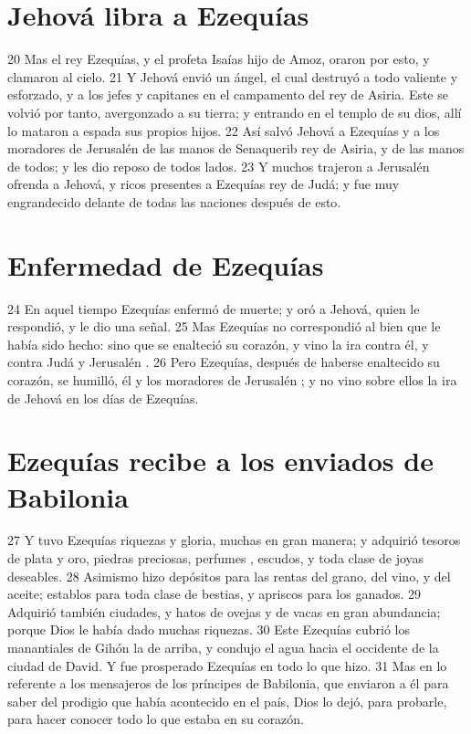 \section*{Jehová libra a Ezequías }

20 Mas el rey Ezequías, y el profeta Isaías hijo de Amoz, oraron por esto, y clamaron al cielo.
21 Y Jehová envió un ángel, el cual destruyó a todo valiente y esforzado, y a los jefes y capitanes en el campamento del rey de Asiria. Este se volvió por tanto, avergonzado a su tierra; y entrando en el templo de su dios, allí lo mataron a espada sus propios hijos.
22 Así salvó Jehová a Ezequías y a los moradores de Jerusalén  de las manos de Senaquerib rey de Asiria, y de las manos de todos; y les dio reposo de todos lados.
23 Y muchos trajeron a Jerusalén ofrenda a Jehová, y ricos presentes a Ezequías rey de Judá; y fue muy engrandecido delante de todas las naciones después de esto.

\section*{Enfermedad de Ezequías }

24 En aquel tiempo Ezequías enfermó de muerte; y oró a Jehová, quien le respondió, y le dio una señal.
25 Mas Ezequías no correspondió al bien que le había sido hecho: sino que se enalteció su corazón, y vino la ira contra él, y contra Judá y Jerusalén .
26 Pero Ezequías, después de haberse enaltecido su corazón, se humilló, él y los moradores de Jerusalén ; y no vino sobre ellos la ira de Jehová en los días de Ezequías.

\section*{Ezequías recibe a los enviados de Babilonia }

27 Y tuvo Ezequías riquezas y gloria, muchas en gran manera; y adquirió tesoros de plata y oro, piedras preciosas, perfumes , escudos, y toda clase de joyas deseables.
28 Asimismo hizo depósitos para las rentas del grano, del vino, y del aceite; establos para toda clase de bestias, y apriscos para los ganados. 
29 Adquirió también ciudades, y hatos de ovejas y de vacas en gran abundancia; porque Dios le había dado muchas riquezas.
30 Este Ezequías cubrió los manantiales de Gihón la de arriba, y condujo el agua hacia el occidente de la ciudad de David. Y fue prosperado Ezequías en todo lo que hizo.
31 Mas en lo referente a los mensajeros de los príncipes de Babilonia, que enviaron a él para saber del prodigio que había acontecido en el país, Dios lo dejó, para probarle, para hacer conocer todo lo que estaba en su corazón.

